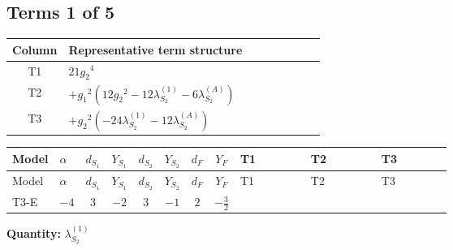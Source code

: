 \documentclass[8pt]{article}
\begin{document}
\begin{landscape}
\subsection*{Terms 1 of 5}
\begin{center}
\begin{tabular}{@{}c >{\raggedright\arraybackslash}p{0.82\linewidth}@{}}
\toprule
Column & Representative term structure \\
\midrule
T1 & \(\displaystyle 21 {g_2}^4\) \\
\midrule
T2 & \(\displaystyle +{g_1}^2 \left(12 {g_2}^2-12 {\lambda_{S_2}^{(1)}}-6 {\lambda_{S_2}^{(A)}}\right)\) \\
\midrule
T3 & \(\displaystyle +{g_2}^2 (-24 {\lambda_{S_2}^{(1)}}-12 {\lambda_{S_2}^{(A)}})\) \\
\midrule
\bottomrule
\end{tabular}
\end{center}
\smallskip
\tiny
\begin{longtable}{@{}llcccccc >{\raggedright\arraybackslash}p{0.21\linewidth} >{\raggedright\arraybackslash}p{0.21\linewidth} >{\raggedright\arraybackslash}p{0.21\linewidth}@{}}
\toprule
Model & $\alpha$ & $d_{S_1}$ & $Y_{S_1}$ & $d_{S_2}$ & $Y_{S_2}$ & $d_F$ & $Y_F$ & T1 & T2 & T3 \\
\midrule
\endfirsthead
\toprule
Model & $\alpha$ & $d_{S_1}$ & $Y_{S_1}$ & $d_{S_2}$ & $Y_{S_2}$ & $d_F$ & $Y_F$ & T1 & T2 & T3 \\
\midrule
\endhead
T3-E & $-4$ & $3$ & $-2$ & $3$ & $-1$ & $2$ & $-\frac{3}{2}$ & \scriptsize\adjustbox{max width=\linewidth}{$\begin{gathered} 21 {g_2}^4\end{gathered}$} & \scriptsize\adjustbox{max width=\linewidth}{$\begin{gathered} +{g_1}^2 \left(12 {g_2}^2-12 {\lambda_{S_2}^{(1)}}-6 {\lambda_{S_2}^{(A)}}\right)\end{gathered}$} & \scriptsize\adjustbox{max width=\linewidth}{$\begin{gathered} +{g_2}^2 (-24 {\lambda_{S_2}^{(1)}}-12 {\lambda_{S_2}^{(A)}})\end{gathered}$} \\
\midrule
\bottomrule
\end{longtable}
\clearpage
\noindent\textbf{Quantity: }$\lambda_{S_2}^{(1)}$\par\smallskip

\end{landscape}
\end{document}
